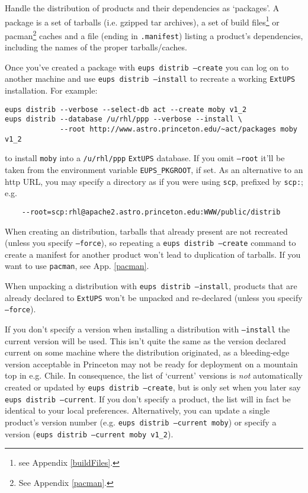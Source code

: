 \documentclass{article}
\newcommand{\code}[1]{\texttt{#1}}
\newcommand{\file}[1]{\texttt{#1}}
\newcommand{\eups}{\code{ExtUPS}}
\newcommand{\pacman}{\code{pacman}}
\begin{document}
\begin{itemize}
Handle the distribution of products and their dependencies as `packages'. A
package is a set of tarballs (i.e. gzipped tar archives), a set of build files\footnote{%
  see Appendix \ref{buildFiles}.
} or pacman\footnote{%
  See Appendix \ref{pacman}.
}
caches and
a file (ending in \code{.manifest})
listing a product's dependencies, including the names of the proper tarballs/caches. 

Once you've created a package with \code{eups distrib --create} you can log on to
another machine and use \code{eups distrib --install} to
recreate a working \eups{} installation.  For example:
\begin{verbatim}
eups distrib --verbose --select-db act --create moby v1_2
eups distrib --database /u/rhl/ppp --verbose --install \
             --root http://www.astro.princeton.edu/~act/packages moby v1_2
\end{verbatim}
to install \code{moby} into a \file{/u/rhl/ppp} \eups{} database. If you omit
\code{--root} it'll be taken from the environment variable \code{EUPS\_PKGROOT},
if set.  As an alternative to an http URL, you may specify a directory as
if you were using \code{scp}, prefixed by \code{scp:}; e.g.
\begin{verbatim}
    --root=scp:rhl@apache2.astro.princeton.edu:WWW/public/distrib
\end{verbatim}

When creating an distribution, tarballs that already present are not recreated
(unless you specify \code{--force}),
so repeating a \code{eups distrib --create} command to create a manifest for another
product won't lead to duplication of tarballs.  If you want to use \pacman{},
see App. \ref{pacman}.

When unpacking a distribution with \code{eups distrib --install}, products that are
already declared to \eups{} won't be unpacked and re-declared (unless you specify \code{--force}).

If you don't specify a version when installing a distribution with
\code{--install} the current version will be used.  This isn't quite the same
as the version declared current on some machine where the distribution
originated, as a bleeding-edge version acceptable in Princeton may not
be ready for deployment on a mountain top in e.g. Chile. In
consequence, the list of `current' versions is \textit{not}
automatically created or updated by \code{eups distrib --create}, but is
only set when you later say \code{eups distrib --current}.  If you don't specify
a product, the list will in fact be identical to your local preferences.
Alternatively, you can update a single product's version number (e.g.
\code{eups distrib --current moby}) or specify a version (\code{eups distrib --current moby v1\_2}).


\end{itemize}
\end{document}
